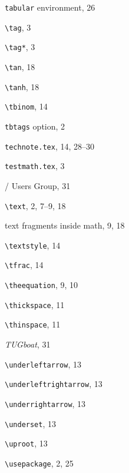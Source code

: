 \documentclass[leqno,titlepage,openany]{amsldoc}[1999/12/13]
\newcommand{\journalname}[1]{\textit{#1}}
\begin{document}
\begin{theindex}
  \indexspace

  \item \texttt{tabular} environment, 26
  \item \verb*+\tag+, 3
  \item \verb*+\tag*+, 3
  \item \verb*+\tan+, 18
  \item \verb*+\tanh+, 18
  \item \verb*+\tbinom+, 14
  \item \texttt{tbtags} option, 2
  \item \texttt{technote.tex}, 14, 28--30
  \item \texttt{testmath.tex}, 3
  \item \tex/ Users Group, 31
  \item \verb*+\text+, 2, 7--9, 18
  \item text fragments inside math, 9, 18
  \item \verb*+\textstyle+, 14
  \item \verb*+\tfrac+, 14
  \item \verb*+\theequation+, 9, 10
  \item \verb*+\thickspace+, 11
  \item \verb*+\thinspace+, 11
  \item \journalname{TUGboat}, 31

  \indexspace

  \item \verb*+\underleftarrow+, 13
  \item \verb*+\underleftrightarrow+, 13
  \item \verb*+\underrightarrow+, 13
  \item \verb*+\underset+, 13
  \item \verb*+\uproot+, 13
  \item \verb*+\usepackage+, 2, 25

  \indexspace


\end{theindex}
\end{document}
